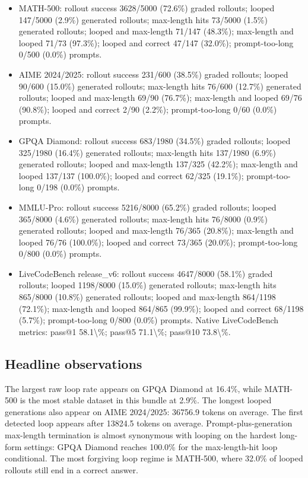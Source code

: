 \documentclass[11pt]{article}
\begin{document}
\begin{itemize}[leftmargin=1.5em]
\item MATH-500: rollout success 3628/5000 (72.6\%) graded rollouts; looped 147/5000 (2.9\%) generated rollouts; max-length hits 73/5000 (1.5\%) generated rollouts; looped and max-length 71/147 (48.3\%); max-length and looped 71/73 (97.3\%); looped and correct 47/147 (32.0\%); prompt-too-long 0/500 (0.0\%) prompts.
\item AIME 2024/2025: rollout success 231/600 (38.5\%) graded rollouts; looped 90/600 (15.0\%) generated rollouts; max-length hits 76/600 (12.7\%) generated rollouts; looped and max-length 69/90 (76.7\%); max-length and looped 69/76 (90.8\%); looped and correct 2/90 (2.2\%); prompt-too-long 0/60 (0.0\%) prompts.
\item GPQA Diamond: rollout success 683/1980 (34.5\%) graded rollouts; looped 325/1980 (16.4\%) generated rollouts; max-length hits 137/1980 (6.9\%) generated rollouts; looped and max-length 137/325 (42.2\%); max-length and looped 137/137 (100.0\%); looped and correct 62/325 (19.1\%); prompt-too-long 0/198 (0.0\%) prompts.
\item MMLU-Pro: rollout success 5216/8000 (65.2\%) graded rollouts; looped 365/8000 (4.6\%) generated rollouts; max-length hits 76/8000 (0.9\%) generated rollouts; looped and max-length 76/365 (20.8\%); max-length and looped 76/76 (100.0\%); looped and correct 73/365 (20.0\%); prompt-too-long 0/800 (0.0\%) prompts.
\item LiveCodeBench release\_v6: rollout success 4647/8000 (58.1\%) graded rollouts; looped 1198/8000 (15.0\%) generated rollouts; max-length hits 865/8000 (10.8\%) generated rollouts; looped and max-length 864/1198 (72.1\%); max-length and looped 864/865 (99.9\%); looped and correct 68/1198 (5.7\%); prompt-too-long 0/800 (0.0\%) prompts. Native LiveCodeBench metrics: pass@1 58.1\textbackslash{}\%; pass@5 71.1\textbackslash{}\%; pass@10 73.8\textbackslash{}\%.
\end{itemize}

\subsection*{Headline observations}
The largest raw loop rate appears on GPQA Diamond at 16.4\%, while MATH-500 is the most stable dataset in this bundle at 2.9\%.
The longest looped generations also appear on AIME 2024/2025: 36756.9 tokens on average. The first detected loop appears after 13824.5 tokens on average.
Prompt-plus-generation max-length termination is almost synonymous with looping on the hardest long-form settings: GPQA Diamond reaches 100.0\% for the max-length-hit loop conditional.
The most forgiving loop regime is MATH-500, where 32.0\% of looped rollouts still end in a correct answer.
\end{document}
